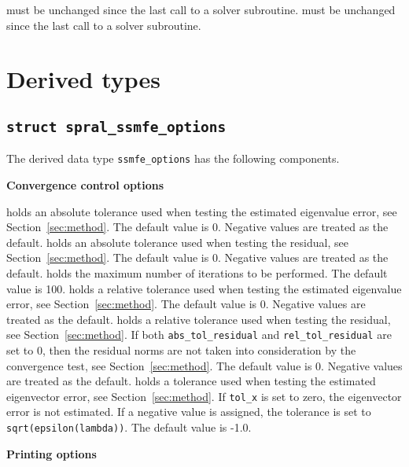 \begin{description}
%
 must be unchanged since the last call to a solver subroutine.
%
 must be unchanged since the last call to a solver subroutine.
%
\end{description}

\section{Derived types}

\subsection{\texttt{struct spral\_ssmfe\_options}} \label{sec:options}

The derived data type
{\tt ssmfe\_options}
has the following components.

\bigskip
\noindent
{\bf Convergence control options}

\begin{description}
%
holds an absolute tolerance used when testing the estimated eigenvalue 
error, see Section~\ref{sec:method}. 
The default value is 0.
Negative values are treated as the default.
%
holds an absolute tolerance used when testing the residual, 
see Section~\ref{sec:method}.
The default value is 0.
Negative values are treated as the default.
%
holds the maximum number of iterations to be performed.
The default value is 100.
%
holds a relative tolerance used when testing the estimated eigenvalue 
error, see Section~\ref{sec:method}. 
The default value is 0. 
Negative values are treated as the default.
%
holds a relative tolerance used when testing the residual,
see Section~\ref{sec:method}. 
If both {\tt abs\_tol\_residual} and {\tt rel\_tol\_residual}
are set to 0, then the residual norms are not taken
into consideration by the convergence test,
see Section~\ref{sec:method}.
The default value is 0.
Negative values are treated as the default.
%
holds a tolerance used when testing the estimated 
eigenvector error, see Section~\ref{sec:method}. 
If {\tt tol\_x} is set to zero, the eigenvector error is not estimated.
If a negative value is assigned, the tolerance is set to
{\tt sqrt(epsilon(lambda))}.
The default value is -1.0.
%
\end{description}

\medskip
\noindent
{\bf Printing options}

